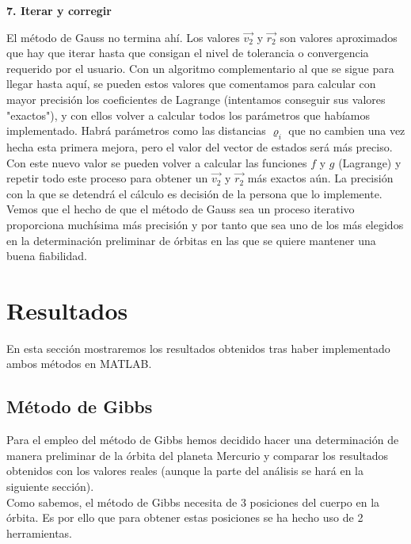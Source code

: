 \documentclass{article}
\numberwithin{equation}{section}
\begin{document}
\noindent\textbf{7. Iterar y corregir}

El método de Gauss no termina ahí. Los valores $\overrightarrow{v_2}$ y $\overrightarrow{r_2}$ son valores aproximados que hay que iterar hasta que consigan el nivel de tolerancia o convergencia requerido por el usuario. Con un algoritmo complementario al que se sigue para llegar hasta aquí, se pueden estos valores que comentamos para calcular con mayor precisión los coeficientes de Lagrange (intentamos conseguir sus valores "exactos"), y con ellos volver a calcular todos los parámetros que habíamos implementado. Habrá parámetros como las distancias $\varrho_i$ que no cambien una vez hecha esta primera mejora, pero el valor del vector de estados será más preciso. Con este nuevo valor se pueden volver a calcular las funciones $f$ y $g$ (Lagrange) y repetir todo este proceso para obtener un $\overrightarrow{v_2}$ y $\overrightarrow{r_2}$ más exactos aún. La precisión con la que se detendrá el cálculo es decisión de la persona que lo implemente.\\

Vemos que el hecho de que el método de Gauss sea un proceso iterativo proporciona muchísima más precisión y por tanto que sea uno de los más elegidos en la determinación preliminar de órbitas en las que se quiere mantener una buena fiabilidad.
\section{Resultados} %
En esta sección mostraremos los resultados obtenidos tras haber 
implementado ambos métodos en MATLAB. %
\subsection{Método de Gibbs}
Para el empleo del método de Gibbs hemos decidido hacer 
una determinación de manera preliminar de la órbita del 
planeta Mercurio y comparar los resultados obtenidos con los 
valores reales (aunque la parte del análisis se hará en 
la siguiente sección). \\

Como sabemos, el método de Gibbs necesita de 3 posiciones 
del cuerpo en la órbita. Es por ello que para obtener estas 
posiciones se ha hecho uso de 2 herramientas. \\
\end{document}
